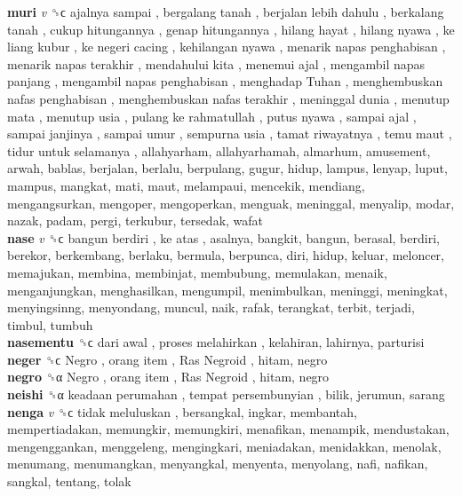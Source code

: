 \textbf{muri} \emph{v}  ␝ϲ   ajalnya sampai ,  bergalang tanah ,  berjalan lebih dahulu ,  berkalang tanah ,  cukup hitungannya ,  genap hitungannya ,  hilang hayat ,  hilang nyawa ,  ke liang kubur ,  ke negeri cacing ,  kehilangan nyawa ,  menarik napas penghabisan ,  menarik napas terakhir ,  mendahului kita ,  menemui ajal ,  mengambil napas panjang ,  mengambil napas penghabisan ,  menghadap Tuhan ,  menghembuskan nafas penghabisan ,  menghembuskan nafas terakhir ,  meninggal dunia ,  menutup mata ,  menutup usia ,  pulang ke rahmatullah ,  putus nyawa ,  sampai ajal ,  sampai janjinya ,  sampai umur ,  sempurna usia ,  tamat riwayatnya ,  temu maut ,  tidur untuk selamanya , allahyarham, allahyarhamah, almarhum, amusement, arwah, bablas, berjalan, berlalu, berpulang, gugur, hidup, lampus, lenyap, luput, mampus, mangkat, mati, maut, melampaui, mencekik, mendiang, mengangsurkan, mengoper, mengoperkan, menguak, meninggal, menyalip, modar, nazak, padam, pergi, terkubur, tersedak, wafat  \\
\textbf{nase} \emph{v}  ␝ϲ   bangun berdiri ,  ke atas , asalnya, bangkit, bangun, berasal, berdiri, berekor, berkembang, berlaku, bermula, berpunca, diri, hidup, keluar, meloncer, memajukan, membina, membinjat, membubung, memulakan, menaik, menganjungkan, menghasilkan, mengumpil, menimbulkan, meninggi, meningkat, menyingsinng, menyondang, muncul, naik, rafak, terangkat, terbit, terjadi, timbul, tumbuh  \\
\textbf{nasementu} ␝ϲ   dari awal ,  proses melahirkan , kelahiran, lahirnya, parturisi  \\
\textbf{neger} ␝ϲ   Negro ,  orang item ,  Ras Negroid , hitam, negro  \\
\textbf{negro} ␝α   Negro ,  orang item ,  Ras Negroid , hitam, negro  \\
\textbf{neishi} ␝α   keadaan perumahan ,  tempat persembunyian , bilik, jerumun, sarang  \\
\textbf{nenga} \emph{v}  ␝ϲ   tidak meluluskan , bersangkal, ingkar, membantah, mempertiadakan, memungkir, memungkiri, menafikan, menampik, mendustakan, mengenggankan, menggeleng, mengingkari, meniadakan, menidakkan, menolak, menumang, menumangkan, menyangkal, menyenta, menyolang, nafi, nafikan, sangkal, tentang, tolak  \\
